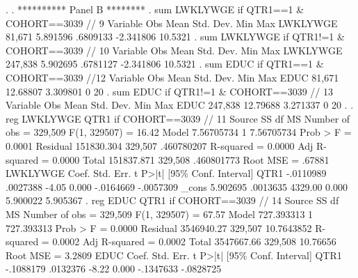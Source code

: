 {\smallskip}
. 
. **********  Panel B ********
. sum LWKLYWGE if QTR1==1 \& COHORT==3039 // 9
{\smallskip}
    Variable {\VBAR}        Obs        Mean    Std. Dev.       Min        Max
    LWKLYWGE {\VBAR}     81,671    5.891596    .6809133  -2.341806    10.5321
{\smallskip}
. sum LWKLYWGE if QTR1!=1 \& COHORT==3039 // 10
{\smallskip}
    Variable {\VBAR}        Obs        Mean    Std. Dev.       Min        Max
    LWKLYWGE {\VBAR}    247,838    5.902695    .6781127  -2.341806    10.5321
{\smallskip}
. sum EDUC if QTR1==1 \& COHORT==3039 //12
{\smallskip}
    Variable {\VBAR}        Obs        Mean    Std. Dev.       Min        Max
        EDUC {\VBAR}     81,671    12.68807    3.309801          0         20
{\smallskip}
. sum EDUC if QTR1!=1 \& COHORT==3039 // 13
{\smallskip}
    Variable {\VBAR}        Obs        Mean    Std. Dev.       Min        Max
        EDUC {\VBAR}    247,838    12.79688    3.271337          0         20
{\smallskip}
. 
. reg LWKLYWGE QTR1 if COHORT==3039 // 11
{\smallskip}
      Source {\VBAR}       SS           df       MS      Number of obs   =   329,509
   F(1, 329507)    =     16.42
       Model {\VBAR}  7.56705734         1  7.56705734   Prob > F        =    0.0001
    Residual {\VBAR}  151830.304   329,507  .460780207   R-squared       =    0.0000
   Adj R-squared   =    0.0000
       Total {\VBAR}  151837.871   329,508  .460801773   Root MSE        =    .67881
{\smallskip}
    LWKLYWGE {\VBAR}      Coef.   Std. Err.      t    P>|t|     [95\% Conf. Interval]
        QTR1 {\VBAR}  -.0110989   .0027388    -4.05   0.000    -.0164669   -.0057309
       _cons {\VBAR}   5.902695   .0013635  4329.00   0.000     5.900022    5.905367
{\smallskip}
. reg EDUC QTR1 if COHORT==3039 // 14
{\smallskip}
      Source {\VBAR}       SS           df       MS      Number of obs   =   329,509
   F(1, 329507)    =     67.57
       Model {\VBAR}  727.393313         1  727.393313   Prob > F        =    0.0000
    Residual {\VBAR}  3546940.27   329,507  10.7643852   R-squared       =    0.0002
   Adj R-squared   =    0.0002
       Total {\VBAR}  3547667.66   329,508    10.76656   Root MSE        =    3.2809
{\smallskip}
        EDUC {\VBAR}      Coef.   Std. Err.      t    P>|t|     [95\% Conf. Interval]
        QTR1 {\VBAR}  -.1088179   .0132376    -8.22   0.000    -.1347633   -.0828725
